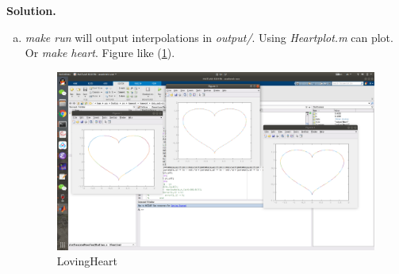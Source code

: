 \documentclass[a4paper]{book}
\newenvironment{solution}%
{\noindent\textbf{Solution.}}%
{\qedhere}
\numberwithin{equation}{chapter}
\theoremstyle{definition}
\begin{document}
\begin{solution}
\begin{enumerate}[(a)]
  \item \textit{make run} will output interpolations in \textit{output/}. Using \textit{Heartplot.m} can plot. Or \textit{make heart}. Figure like (\ref{fig:3}).
    \begin{figure}
      \centering
      \includegraphics[scale = 0.25]{Heart}
      \caption{LovingHeart}\label{fig:3}
    \end{figure}
  \end{enumerate}
\end{solution}
%   

%   

%   


\end{document}
